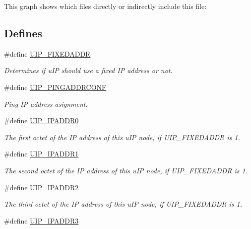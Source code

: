 This graph shows which files directly or indirectly include this file:\subsection*{Defines}
\begin{CompactItemize}
\item 
\#define \hyperlink{a00071_g51195ea7cd5aa387a87f9d3b23905b62}{UIP\_\-FIXEDADDR}
\begin{CompactList}\small\item\em Determines if u\-IP should use a fixed IP address or not. \item\end{CompactList}\item 
\#define \hyperlink{a00071_g9069474ea570fd78c481aa164317dbaf}{UIP\_\-PINGADDRCONF}
\begin{CompactList}\small\item\em Ping IP address asignment. \item\end{CompactList}\item 
\hypertarget{a00071_g0facfb44aa4e7176d0f1c38670a0397f}{
\#define \hyperlink{a00071_g0facfb44aa4e7176d0f1c38670a0397f}{UIP\_\-IPADDR0}}
\label{a00071_g0facfb44aa4e7176d0f1c38670a0397f}

\begin{CompactList}\small\item\em The first octet of the IP address of this u\-IP node, if UIP\_\-FIXEDADDR is 1. \item\end{CompactList}\item 
\hypertarget{a00071_gb74cfea1049b4632926ec8afc8a0aa2a}{
\#define \hyperlink{a00071_gb74cfea1049b4632926ec8afc8a0aa2a}{UIP\_\-IPADDR1}}
\label{a00071_gb74cfea1049b4632926ec8afc8a0aa2a}

\begin{CompactList}\small\item\em The second octet of the IP address of this u\-IP node, if UIP\_\-FIXEDADDR is 1. \item\end{CompactList}\item 
\hypertarget{a00071_g493075d5d1f5fae1eff7aa7bea2b9ca7}{
\#define \hyperlink{a00071_g493075d5d1f5fae1eff7aa7bea2b9ca7}{UIP\_\-IPADDR2}}
\label{a00071_g493075d5d1f5fae1eff7aa7bea2b9ca7}

\begin{CompactList}\small\item\em The third octet of the IP address of this u\-IP node, if UIP\_\-FIXEDADDR is 1. \item\end{CompactList}\item 
\hypertarget{a00071_g962e0ce14baef52129745780b1a45730}{
\#define \hyperlink{a00071_g962e0ce14baef52129745780b1a45730}{UIP\_\-IPADDR3}}
\label{a00071_g962e0ce14baef52129745780b1a45730}


\end{CompactItemize}
